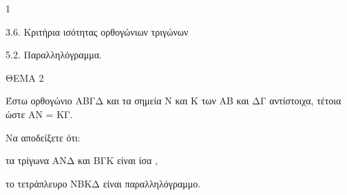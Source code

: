 \begin{ylh}{1}
    \item 3.6. Κριτήρια ισότητας ορθογώνιων τριγώνων
    \item 5.2. Παραλληλόγραμμα.
\end{ylh}

ΘΕΜΑ 2

Έστω ορθογώνιο ΑΒΓΔ και τα σημεία Ν και Κ των ΑΒ και ΔΓ αντίστοιχα, τέτοια ώστε ΑΝ = ΚΓ.

Να αποδείξετε ότι:

\begin{alist}
\item τα τρίγωνα ΑΝΔ και ΒΓΚ είναι ίσα , 

\item το τετράπλευρο ΝΒΚΔ είναι παραλληλόγραμμο. 
\end{alist}
